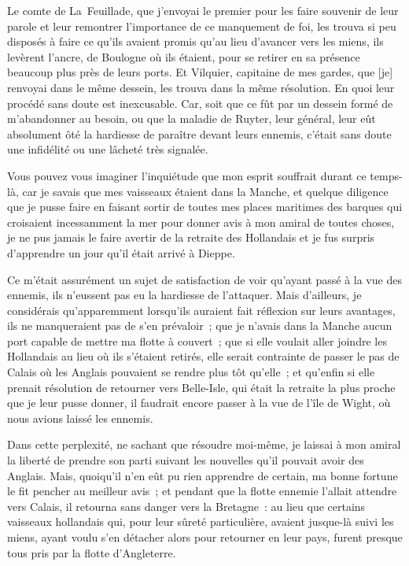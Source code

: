 \documentclass[french,twoside]{book} %
\begin{document}
Le comte de La Feuillade, que j’envoyai le premier pour les faire souvenir de leur parole et leur remontrer l’importance de ce manquement de foi, les trouva si peu disposés à faire ce qu’ils avaient promis qu’au lieu d’avancer vers les miens, ils levèrent l’ancre, de Boulogne où ils étaient, pour se retirer en sa présence beaucoup plus près de leurs ports. Et Vilquier, capitaine de mes gardes, que [je] renvoyai dans le même dessein, les trouva dans la même résolution. En quoi leur procédé sans doute est inexcusable. Car, soit que ce fût par un dessein formé de m’abandonner au besoin, ou que la maladie de Ruyter, leur général, leur eût absolument ôté la hardiesse de paraître devant leurs ennemis, c’était sans doute une infidélité ou une lâcheté très signalée.\par
Vous pouvez vous imaginer l’inquiétude que mon esprit souffrait durant ce temps-là, car je savais que mes vaisseaux étaient dans la Manche, et quelque diligence que je pusse faire en faisant sortir de toutes mes places maritimes des barques qui croisaient incessamment la mer pour donner avis à mon amiral de toutes choses, je ne pus jamais le faire avertir de la retraite des Hollandais et je fus surpris d’apprendre un jour qu’il était arrivé à Dieppe.\par
Ce m’était assurément un sujet de satisfaction de voir qu’ayant passé à la vue des ennemis, ils n’eussent pas eu la hardiesse de l’attaquer. Mais d’ailleurs, je considérais qu’apparemment lorsqu’ils auraient fait réflexion sur leurs avantages, ils ne manqueraient pas de s’en prévaloir ; que je n’avais dans la Manche aucun port capable de mettre ma flotte à couvert ; que si elle voulait aller joindre les Hollandais au lieu où ils s’étaient retirés, elle serait contrainte de passer le pas de Calais où les Anglais pouvaient se rendre plus tôt qu’elle ; et qu’enfin si elle prenait résolution de retourner vers Belle-Isle, qui était la retraite la plus proche que je leur pusse donner, il faudrait encore passer à la vue de l’île de Wight, où nous avions laissé les ennemis.\par
Dans cette perplexité, ne sachant que résoudre moi-même, je laissai à mon amiral la liberté de prendre son parti suivant les nouvelles qu’il pouvait avoir des Anglais. Mais, quoiqu’il n’en eût pu rien apprendre de certain, ma bonne fortune le fit pencher au meilleur avis ; et pendant que la flotte ennemie l’allait attendre vers Calais, il retourna sans danger vers la Bretagne : au lieu que certains vaisseaux hollandais qui, pour leur sûreté particulière, avaient jusque-là suivi les miens, ayant voulu s’en détacher alors pour retourner en leur pays, furent presque tous pris par la flotte d’Angleterre.\par
\end{document}
